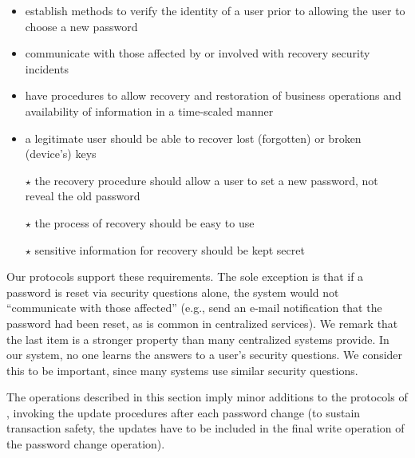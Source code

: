 \begin{itemize}
	\item establish methods to verify the identity of a user prior to allowing the user to choose a new password
	\item communicate with those affected by or involved with recovery security incidents 
	\item have procedures to allow recovery and restoration of business operations and availability of information in a time-scaled manner 
	\item a legitimate user should be able to recover lost (forgotten) or broken (device's) keys
	\item[$\star$] the recovery procedure should allow a user to set a new password, not reveal the old password
	\item[$\star$] the process of recovery should be easy to use
	\item[$\star$] sensitive information for recovery should be kept secret
\end{itemize}
Our protocols support these requirements. The sole exception is that if a
password is reset via security questions alone, the system would not
``communicate with those affected'' (e.g., send an e-mail notification that
the password had been reset, as is common in centralized services).
We remark that the last item is a stronger property than many
centralized systems provide. In our system, no one learns the
answers to a user's security questions. We consider this to be
important, since many systems use similar security questions.

The operations described in this section imply minor additions to the protocols
of , \ie invoking the update procedures after each password change
(to sustain transaction safety, the updates have to be included in the final write operation of
the password change operation).

